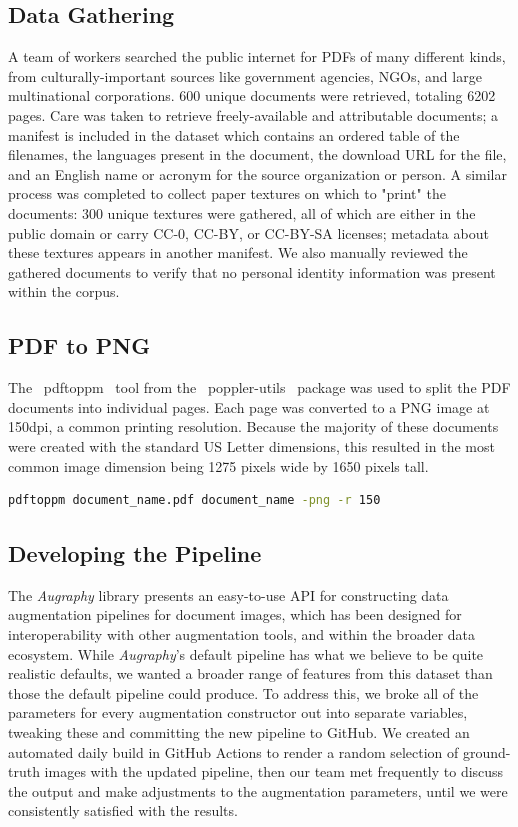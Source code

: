 \documentclass[runningheads]{llncs}
\begin{document}
\subsection{Data Gathering}
A team of workers searched the public internet for PDFs of many different kinds, from culturally-important sources like government agencies, NGOs, and large multinational corporations.
600 unique documents were retrieved, totaling 6202 pages.
Care was taken to retrieve freely-available and attributable documents; a manifest is included in the dataset which contains an ordered table of the filenames, the languages present in the document, the download URL for the file, and an English name or acronym for the source organization or person.
A similar process was completed to collect paper textures on which to "print" the documents: 300 unique textures were gathered, all of which are either in the public domain or carry CC-0, CC-BY, or CC-BY-SA licenses; metadata about these textures appears in another manifest.
We also manually reviewed the gathered documents to verify that no personal identity information was present within the corpus.

\subsection{PDF to PNG}
The ~pdftoppm~ tool from the ~poppler-utils~ package was used to split the PDF documents into individual pages.
Each page was converted to a PNG image at 150dpi, a common printing resolution.
Because the majority of these documents were created with the standard US Letter dimensions, this resulted in the most common image dimension being 1275 pixels wide by 1650 pixels tall.

\begin{lstlisting}[language=bash]
  pdftoppm document_name.pdf document_name -png -r 150
\end{lstlisting}

\subsection{Developing the Pipeline}
The \emph{Augraphy} library presents an easy-to-use API for constructing data augmentation pipelines for document images, which has been designed for interoperability with other augmentation tools, and within the broader data ecosystem.
While \emph{Augraphy}'s default pipeline has what we believe to be quite realistic defaults, we wanted a broader range of features from this dataset than those the default pipeline could produce.
To address this, we broke all of the parameters for every augmentation constructor out into separate variables, tweaking these and committing the new pipeline to GitHub.
We created an automated daily build in GitHub Actions to render a random selection of ground-truth images with the updated pipeline, then our team met frequently to discuss the output and make adjustments to the augmentation parameters, until we were consistently satisfied with the results.
\end{document}
